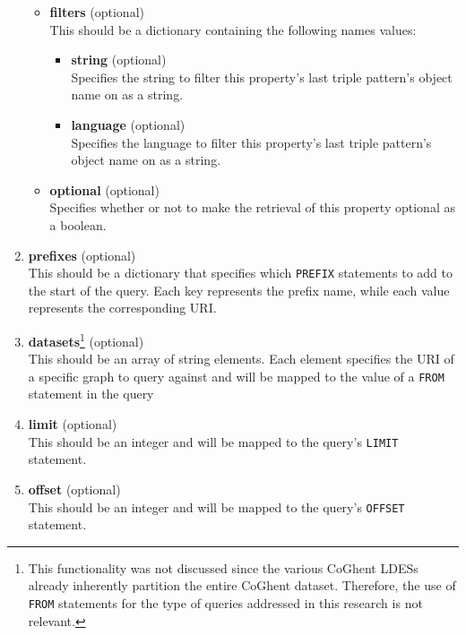 \begin{enumerate}
\begin{itemize}
        \item \textbf{filters} (optional)\\
        This should be a dictionary containing the following names values:
        \begin{itemize}
            \item \textbf{string} (optional)\\
            Specifies the string to filter this property's last triple pattern's object name on as a string.

            \item \textbf{language} (optional)\\
            Specifies the language to filter this property's last triple pattern's object name on as a string.
            
        \end{itemize}

        \item \textbf{optional} (optional)\\
        Specifies whether or not to make the retrieval of this property optional as a boolean.

    \end{itemize}

    \item \textbf{prefixes} (optional)\\
    This should be a dictionary that specifies which \texttt{PREFIX} statements to add to the start of the query. Each key represents the prefix name, while each value represents the corresponding URI.

    \item \textbf{datasets}\footnote{This functionality was not discussed since the various CoGhent LDESs already inherently partition the entire CoGhent dataset. Therefore, the use of \texttt{FROM} statements for the type of queries addressed in this research is not relevant.} (optional)\\
    This should be an array of string elements. Each element specifies the URI of a specific graph to query against and will be mapped to the value of a \texttt{FROM} statement in the query

    \item \textbf{limit} (optional)\\
    This should be an integer and will be mapped to the query's \texttt{LIMIT} statement.

    \item \textbf{offset} (optional)\\
    This should be an integer and will be mapped to the query's \texttt{OFFSET} statement.

\end{enumerate}

